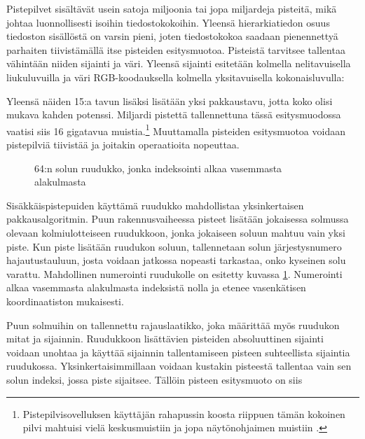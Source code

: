 Pistepilvet sisältävät usein satoja miljoonia tai jopa miljardeja pisteitä, mikä johtaa luonnollisesti isoihin tiedostokokoihin. Yleensä hierarkiatiedon osuus tiedoston sisällöstä on varsin pieni, joten tiedostokokoa saadaan pienennettyä parhaiten tiivistämällä itse pisteiden esitysmuotoa. Pisteistä tarvitsee tallentaa vähintään niiden sijainti ja väri. Yleensä sijainti esitetään kolmella nelitavuisella liukuluvuilla ja väri RGB-koodauksella kolmella yksitavuisella kokonaisluvulla:


\noindent Yleensä näiden 15:a tavun lisäksi lisätään yksi pakkaustavu, jotta koko olisi mukava kahden potenssi. Miljardi pistettä tallennettuna tässä esitysmuodossa vaatisi siis 16 gigatavua muistia.\footnote{Pistepilvisovelluksen käyttäjän rahapussin koosta riippuen tämän kokoinen pilvi mahtuisi vielä keskusmuistiin ja jopa näytönohjaimen muistiin \cite{rtx}.} Muuttamalla pisteiden esitysmuotoa voidaan pistepilviä tiivistää ja joitakin operaatioita nopeuttaa.

\begin{figure}
    
    \caption{64:n solun ruudukko, jonka indeksointi alkaa vasemmasta alakulmasta}
    \label{ruudukkokuva}
\end{figure}

Sisäkkäispistepuiden käyttämä ruudukko mahdollistaa yksinkertaisen pakkausalgoritmin. Puun rakennusvaiheessa pisteet lisätään jokaisessa solmussa olevaan kolmiulotteiseen ruudukkoon, jonka jokaiseen soluun mahtuu vain yksi piste. Kun piste lisätään ruudukon soluun, tallennetaan solun järjestysnumero hajautustauluun, josta voidaan jatkossa nopeasti tarkastaa, onko kyseinen solu varattu. Mahdollinen numerointi ruudukolle on esitetty kuvassa \ref{ruudukkokuva}. Numerointi alkaa vasemmasta alakulmasta indeksistä nolla ja etenee vasenkätisen koordinaatiston mukaisesti. 

Puun solmuihin on tallennettu rajauslaatikko, joka määrittää myös ruudukon mitat ja sijainnin. Ruudukkoon lisättävien pisteiden absoluuttinen sijainti voidaan unohtaa ja käyttää sijainnin tallentamiseen pisteen suhteellista sijaintia ruudukossa. Yksinkertaisimmillaan voidaan kustakin pisteestä tallentaa vain sen solun indeksi, jossa piste sijaitsee. Tällöin pisteen esitysmuoto on siis

